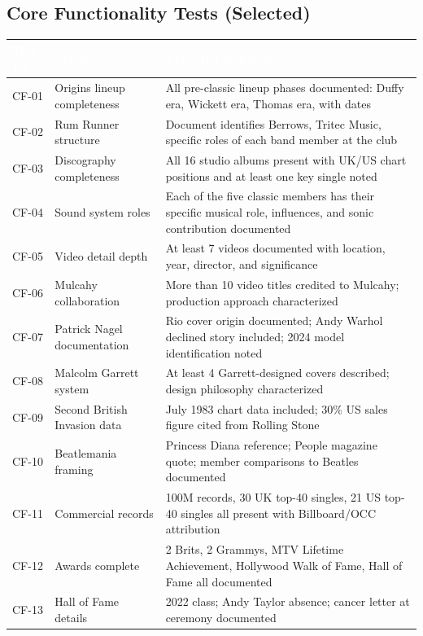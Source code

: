 \documentclass[11pt,letterpaper]{article}
\newcommand{\tableheader}[1]{\textbf{\sffamily\textcolor{white}{#1}}}
\begin{document}
\subsection{Core Functionality Tests (Selected)}

\begin{center}
\begin{tabularx}{\textwidth}{C{1.5cm}L{4.5cm}X}
\toprule
{}
\tableheader{Test ID} & \tableheader{Verifies} & \tableheader{Expected Behavior} \\
\midrule
CF-01 & Origins lineup completeness & All pre-classic lineup phases documented: Duffy era, Wickett era, Thomas era, with dates \\
CF-02 & Rum Runner structure & Document identifies Berrows, Tritec Music, specific roles of each band member at the club \\
CF-03 & Discography completeness & All 16 studio albums present with UK/US chart positions and at least one key single noted \\
CF-04 & Sound system roles & Each of the five classic members has their specific musical role, influences, and sonic contribution documented \\
CF-05 & Video detail depth & At least 7 videos documented with location, year, director, and significance \\
CF-06 & Mulcahy collaboration & More than 10 video titles credited to Mulcahy; production approach characterized \\
CF-07 & Patrick Nagel documentation & Rio cover origin documented; Andy Warhol declined story included; 2024 model identification noted \\
CF-08 & Malcolm Garrett system & At least 4 Garrett-designed covers described; design philosophy characterized \\
CF-09 & Second British Invasion data & July 1983 chart data included; 30\% US sales figure cited from Rolling Stone \\
CF-10 & Beatlemania framing & Princess Diana reference; People magazine quote; member comparisons to Beatles documented \\
CF-11 & Commercial records & 100M records, 30 UK top-40 singles, 21 US top-40 singles all present with Billboard/OCC attribution \\
CF-12 & Awards complete & 2 Brits, 2 Grammys, MTV Lifetime Achievement, Hollywood Walk of Fame, Hall of Fame all documented \\
CF-13 & Hall of Fame details & 2022 class; Andy Taylor absence; cancer letter at ceremony documented \\

\end{tabularx}
\end{center}
\end{document}
